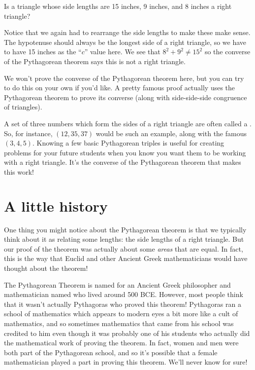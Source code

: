 \documentclass{ximera}
\begin{document}
\begin{question}
Is a triangle whose side lengths are 15 inches, 9 inches, and 8 inches a right triangle?
\begin{multipleChoice}
\end{multipleChoice}
\begin{feedback}[correct] Notice that we again had to rearrange the side lengths to make these make sense. The hypotenuse should always be the longest side of a right triangle, so we have to have 15 inches as the ``$c$'' value here. We see that $8^2 + 9^2 \neq 15^2$ so the converse of the Pythagorean theorem says this is not a right triangle.
\end{feedback}
\end{question}
We won't prove the converse of the Pythagorean theorem here, but you can try to do this on your own if you'd like. A pretty famous proof actually uses the Pythagorean theorem to prove its converse (along with side-side-side congruence of triangles).

A set of three numbers which form the sides of a right triangle are often called a . So, for instance, $(12, 35, 37)$ would be such an example, along with the famous $(3, 4, 5)$. Knowing a few basic Pythagorean triples is useful for creating problems for your future students when you know you want them to be working with a right triangle. It's the converse of the Pythagorean theorem that makes this work!


\section{A little history}
One thing you might notice about the Pythagorean theorem is that we typically think about it as relating some lengths: the side lengths of a right triangle. But our proof of the theorem was actually about some \emph{areas} that are equal. In fact, this is the way that Euclid and other Ancient Greek mathematicians would have thought about the theorem!

The Pythagorean Theorem is named for an Ancient Greek philosopher and mathematician named  who lived around 500 BCE. However, most people think that it wasn't actually Pythagoras who proved this theorem! Pythagoras ran a school of mathematics which appears to modern eyes a bit more like a cult of mathematics, and so sometimes mathematics that came from his school was credited to him even though it was probably one of his students who actually did the mathematical work of proving the theorem. In fact, women and men were both part of the Pythagorean school, and so it's possible that a female mathematician played a part in proving this theorem. We'll never know for sure!
\end{document}
